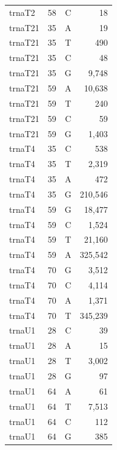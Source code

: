 \documentclass[12pt]{rockefeller}
\begin{document}
{\begin{center}
\begin{supertabular}{|l|r|c|r|}
  trnaT2 &        58 &          C &         18 \\
 trnaT21 &        35 &          A &         19 \\
 trnaT21 &        35 &          T &        490 \\
 trnaT21 &        35 &          C &         48 \\
 trnaT21 &        35 &          G &      9,748 \\
 trnaT21 &        59 &          A &     10,638 \\
 trnaT21 &        59 &          T &        240 \\
 trnaT21 &        59 &          C &         59 \\
 trnaT21 &        59 &          G &      1,403 \\
  trnaT4 &        35 &          C &        538 \\
  trnaT4 &        35 &          T &      2,319 \\
  trnaT4 &        35 &          A &        472 \\
  trnaT4 &        35 &          G &    210,546 \\
  trnaT4 &        59 &          G &     18,477 \\
  trnaT4 &        59 &          C &      1,524 \\
  trnaT4 &        59 &          T &     21,160 \\
  trnaT4 &        59 &          A &    325,542 \\
  trnaT4 &        70 &          G &      3,512 \\
  trnaT4 &        70 &          C &      4,114 \\
  trnaT4 &        70 &          A &      1,371 \\
  trnaT4 &        70 &          T &    345,239 \\
  trnaU1 &        28 &          C &         39 \\
  trnaU1 &        28 &          A &         15 \\
  trnaU1 &        28 &          T &      3,002 \\
  trnaU1 &        28 &          G &         97 \\
  trnaU1 &        64 &          A &         61 \\
  trnaU1 &        64 &          T &      7,513 \\
  trnaU1 &        64 &          C &        112 \\
  trnaU1 &        64 &          G &        385 \\

\end{supertabular}
\end{center}}
\end{document}
